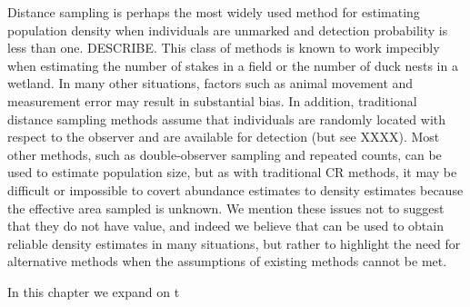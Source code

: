 Distance sampling is perhaps the most widely used method for
estimating population density when individuals are unmarked and
detection probability is less than one. DESCRIBE. This class of methods is known
to work impecibly when estimating the number of stakes in a field or
the number of duck nests in a wetland. In many other situations,
factors such as animal movement and measurement error may result in
substantial bias. In addition, traditional distance sampling methods
assume that individuals are randomly located with respect to the
observer and are available for detection (but see XXXX). Most other
methods, such as double-observer sampling and repeated counts, can be
used to estimate population size, but as with traditional CR methods,
it may be difficult or impossible to covert abundance estimates to
density estimates because the effective area sampled is unknown. We
mention these issues not to suggest that they do not have value, and
indeed we believe that can be used to obtain reliable density
estimates in many situations, but rather to highlight the need for
alternative methods when the assumptions of existing methods cannot be
met.

In this chapter we expand on t






